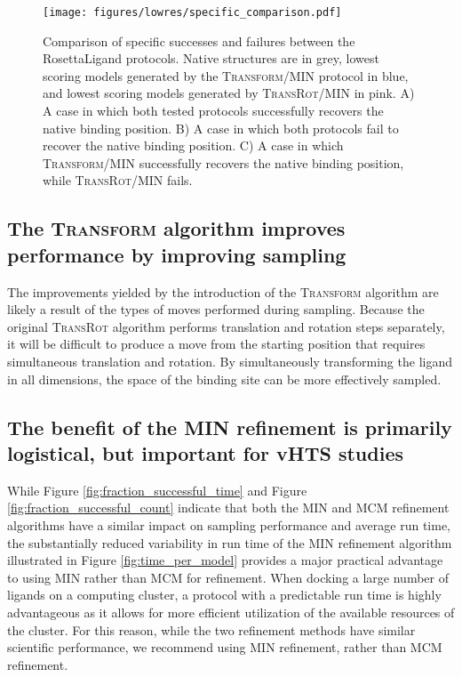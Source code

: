 \begin{figure}
\centering
\texttt{[image: figures/lowres/specific\_comparison.pdf]}
\caption{
Comparison of specific successes and failures between the RosettaLigand protocols.
Native structures are in grey, lowest scoring models generated by the \textsc{Transform}/\acs{MIN} protocol in blue, and lowest scoring models generated by \textsc{TransRot}/\acs{MIN} in pink.
A) A case in which both tested protocols successfully recovers the native binding position.
B) A case in which both protocols fail to recover the native binding position. 
C) A case in which \textsc{Transform}/\acs{MIN} successfully recovers the native binding position, while \textsc{TransRot}/\acs{MIN} fails.
}
\label{fig:specific_comparison}
\end{figure}

\subsection{The \textsc{Transform} algorithm improves performance by improving sampling}
The improvements yielded by the introduction of the \textsc{Transform} algorithm are likely a result of the types of moves performed during sampling.
Because the original \textsc{TransRot} algorithm performs translation and rotation steps separately, it will be difficult to produce a move from the starting position that requires simultaneous translation and rotation.
By simultaneously transforming the ligand in all dimensions, the space of the binding site can be more effectively sampled. 

\subsection{The benefit of the \acs{MIN} refinement is primarily logistical, but important for \acs{vHTS} studies}
While Figure \ref{fig:fraction_successful_time} and Figure \ref{fig:fraction_successful_count} indicate that both the \ac{MIN} and \ac{MCM} refinement algorithms have a similar impact on sampling performance and average run time, the substantially reduced variability in run time of the \ac{MIN} refinement algorithm illustrated in Figure \ref{fig:time_per_model} provides a major practical advantage to using \ac{MIN} rather than \ac{MCM} for refinement.
When docking a large number of ligands on a computing cluster, a protocol with a predictable run time is highly advantageous as it allows for more efficient utilization of the available resources of the cluster. 
For this reason, while the two refinement methods have similar scientific performance, we recommend using \ac{MIN} refinement, rather than \ac{MCM} refinement. 

